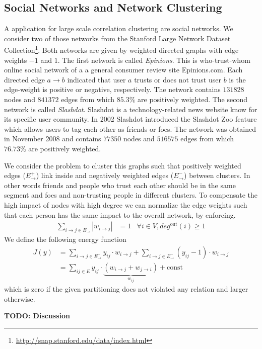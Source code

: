 \documentclass[10pt,twocolumn,letterpaper]{article}
\theoremstyle{definition}
\begin{document}
\subsection{Social Networks and Network Clustering}
A application for large scale correlation clustering are social networks.
We consider two of those networks from the Stanford Large Network Dataset Collection\footnote{\url{http://snap.stanford.edu/data/index.html}}.
Both networks are given by weighted directed graphs with edge weights $-1$ and $1$. 
%
The first network is called \emph{Epinions}. 
This is who-trust-whom online social network of a a general consumer review site Epinions.com. 
Each directed edge $a\to b$ indicated that user $a$ trusts  or does not trust user $b$ is the edge-weight is positive or negative, respectively.
The network contains $131828$ nodes and $841372$ edges from which $85.3\%$ are positively weighted.
%
The second network is called \emph{Slashdot}. 
Slashdot is a technology-related news website know for its specific user community. 
In 2002 Slashdot introduced the Slashdot Zoo feature which allows users to tag each other as friends or foes. 
The network was obtained in November 2008 and contains $77350$ nodes and $516575$ edges from which $76.73\%$ are positively weighted.

We consider the problem to cluster this graphs such that positively weighted edges ($E^+_{\to}$) link inside and negatively weighted edges ($E^-_{\to}$) between clusters.
In other words friends and people who trust each other should be in the same segment and foes and non-trusting people in different clusters.
% 
To compensate the high impact of nodes with high degree we can normalize the edge weights such that each person has the same impact to the overall network, by enforcing.
\begin{align}
  \sum_{i\to j \in E_{\to}} |w_{i\to j}| &= 1&\forall i\in V, deg^{\textrm{out}}(i)\geq 1 
\end{align}
We define the following energy function
\begin{align}
 J(y) &= \sum_{i\to j \in E^+_{\to}} y_{ij}\cdot w_{i \to j} +  \sum_{i\to j \in E^-_{\to}} (y_{ij}-1)\cdot w_{i \to j} \nonumber\\
      &= \sum_{ij \in E} y_{ij}\cdot \underbrace{(w_{i \to j}+w_{j \to i})}_{w_{ij}} + \textrm{const}
\end{align}
which is zero if the given partitioning does not violated any relation and larger otherwise.

{\color{red}\textbf{TODO: Discussion}}
\end{document}

